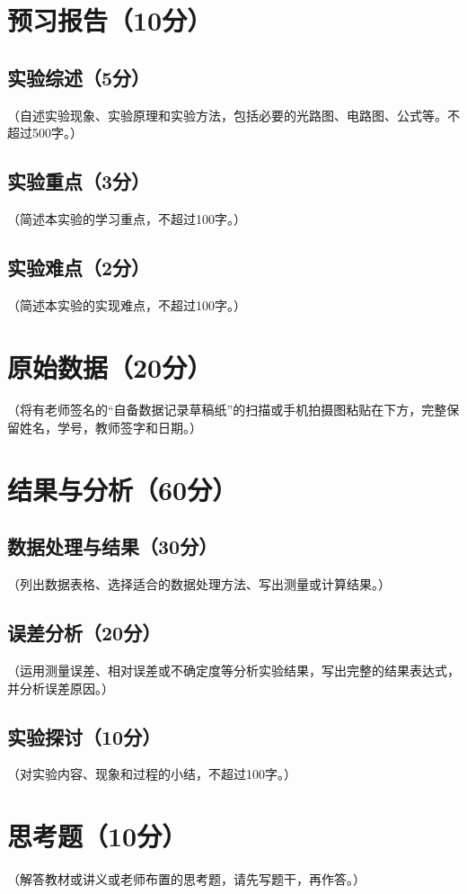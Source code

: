 \documentclass{Preport}
\begin{document}
\setcounter{page}{0}
\makecover

\section{预习报告（10分）}
\subsection{实验综述（5分）}
（自述实验现象、实验原理和实验方法，包括必要的光路图、电路图、公式等。不超过500字。）

\subsection{实验重点（3分）}
（简述本实验的学习重点，不超过100字。）

\subsection{实验难点（2分）}
（简述本实验的实现难点，不超过100字。）

\section{原始数据（20分）}
（将有老师签名的“自备数据记录草稿纸”的扫描或手机拍摄图粘贴在下方，完整保留姓名，学号，教师签字和日期。）

\section{结果与分析（60分）}
\subsection{数据处理与结果（30分）}
（列出数据表格、选择适合的数据处理方法、写出测量或计算结果。）

\subsection{误差分析（20分）}
（运用测量误差、相对误差或不确定度等分析实验结果，写出完整的结果表达式，并分析误差原因。）

\subsection{实验探讨（10分）}
（对实验内容、现象和过程的小结，不超过100字。）

\section{思考题（10分）}
（解答教材或讲义或老师布置的思考题，请先写题干，再作答。）


\end{document}
